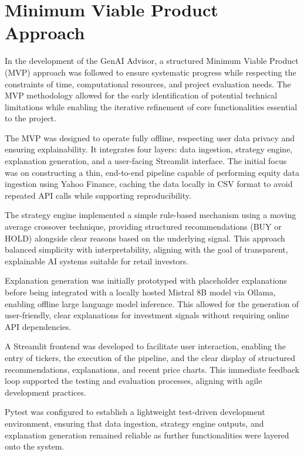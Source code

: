 \section{Minimum Viable Product Approach}

In the development of the GenAI Advisor, a structured Minimum Viable Product (MVP) approach was followed to ensure systematic progress while respecting the constraints of time, computational resources, and project evaluation needs. The MVP methodology allowed for the early identification of potential technical limitations while enabling the iterative refinement of core functionalities essential to the project.

The MVP was designed to operate fully offline, respecting user data privacy and ensuring explainability. It integrates four layers: data ingestion, strategy engine, explanation generation, and a user-facing Streamlit interface. The initial focus was on constructing a thin, end-to-end pipeline capable of performing equity data ingestion using Yahoo Finance, caching the data locally in CSV format to avoid repeated API calls while supporting reproducibility.

The strategy engine implemented a simple rule-based mechanism using a moving average crossover technique, providing structured recommendations (BUY or HOLD) alongside clear reasons based on the underlying signal. This approach balanced simplicity with interpretability, aligning with the goal of transparent, explainable AI systems suitable for retail investors.

Explanation generation was initially prototyped with placeholder explanations before being integrated with a locally hosted Mistral 8B model via Ollama, enabling offline large language model inference. This allowed for the generation of user-friendly, clear explanations for investment signals without requiring online API dependencies.

A Streamlit frontend was developed to facilitate user interaction, enabling the entry of tickers, the execution of the pipeline, and the clear display of structured recommendations, explanations, and recent price charts. This immediate feedback loop supported the testing and evaluation processes, aligning with agile development practices.

Pytest was configured to establish a lightweight test-driven development environment, ensuring that data ingestion, strategy engine outputs, and explanation generation remained reliable as further functionalities were layered onto the system.

